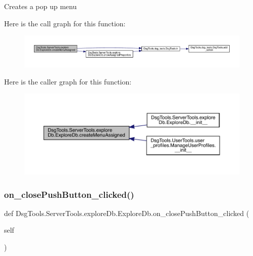 \begin{DoxyVerb}Creates a pop up menu
\end{DoxyVerb}
 Here is the call graph for this function\+:
\nopagebreak
\begin{figure}[H]
\begin{center}
\leavevmode
\includegraphics[width=350pt]{class_dsg_tools_1_1_server_tools_1_1explore_db_1_1_explore_db_a8f2a2a5c58fcd3212e350caf0b089775_cgraph}
\end{center}
\end{figure}
Here is the caller graph for this function\+:
\nopagebreak
\begin{figure}[H]
\begin{center}
\leavevmode
\includegraphics[width=350pt]{class_dsg_tools_1_1_server_tools_1_1explore_db_1_1_explore_db_a8f2a2a5c58fcd3212e350caf0b089775_icgraph}
\end{center}
\end{figure}
\mbox{\label{class_dsg_tools_1_1_server_tools_1_1explore_db_1_1_explore_db_aa15d42028000d63f7dffe60405edade4}} 
\subsubsection{\texorpdfstring{on\+\_\+close\+Push\+Button\+\_\+clicked()}{on\_closePushButton\_clicked()}}
{\footnotesize\ttfamily def Dsg\+Tools.\+Server\+Tools.\+explore\+Db.\+Explore\+Db.\+on\+\_\+close\+Push\+Button\+\_\+clicked (\begin{DoxyParamCaption}\item[{}]{self }\end{DoxyParamCaption})}

